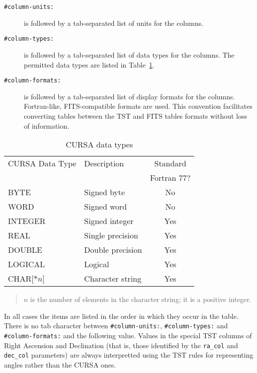 \documentclass[twoside,11pt,nolof,chapters]{starlink}
\begin{document}
\begin{description}

  \item[\texttt{\#column-units:}] is followed by a tab-separated list of
   units for the columns.

  \item[\texttt{\#column-types:}] is followed by a tab-separated list of
   data types for the columns.  The permitted data types are listed in
   Table~\ref{DATA_TYPES}.

  \item[\texttt{\#column-formats:}] is followed by a tab-separated list of
   display formats for the columns.  Fortran-like, FITS-compatible formats
   are used.  This convention facilitates converting tables between the
   TST and FITS tables formats without loss of information.

\end{description}

\begin{table}[htbp]

\begin{center}
\begin{tabular}{llc}
CURSA Data Type & Description      & Standard \\
                &                  & Fortran 77? \\ \hline
BYTE            & Signed byte      & No   \\
WORD            & Signed word      & No   \\
INTEGER         & Signed integer   & Yes  \\
REAL            & Single precision & Yes  \\
DOUBLE          & Double precision & Yes  \\
LOGICAL         & Logical          & Yes  \\
CHAR[$*n$]      & Character string & Yes  \\
\end{tabular}

\begin{quote}
$n$ is the number of elements in the character string; it is a positive
integer.
\end{quote}

\caption{CURSA data types \label{DATA_TYPES} }
\end{center}

\end{table}

In all cases the items are listed in the order in which they occur
in the table.  There is no tab character between \texttt{\#column-units:},
\texttt{\#column-types:} and \texttt{\#column-formats:} and the following
value.  Values in the special TST columns of Right Ascension and
Declination (that is, those identified by the \texttt{ra\_col} and \texttt{dec\_col} parameters) are always interpretted using the TST rules for
representing angles rather than the CURSA ones.
\end{document}
